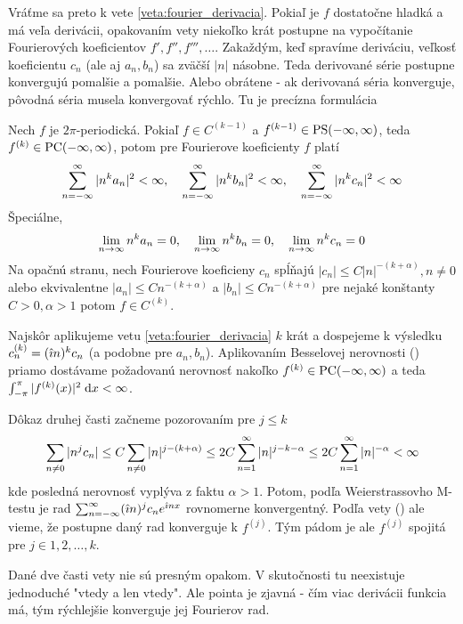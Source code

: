 Vráťme sa preto k vete \ref{veta:fourier_derivacia}. Pokiaľ
je $f$ dostatočne hladká a má veľa derivácii, opakovaním vety
niekoľko krát postupne na vypočítanie Fourierových koeficientov
$f',f'',f''',\dots$. Zakaždým, keď spravíme deriváciu, veľkosť
koeficientu $c_n$ (ale aj $a_n,b_n$) sa zväčší $|n|$ násobne. Teda
derivované série postupne konvergujú pomalšie a pomalšie. Alebo obrátene - 
ak derivovaná séria konverguje, pôvodná séria musela konvergovať
rýchlo. Tu je precízna formulácia
\begin{veta}
    Nech $f$ je $2\pi$-periodická. Pokiaľ
    $f\in C^(k-1)$ a $f^{(k-1)} \in \mbox{PS}(-\infty,\infty)$, teda $f^{(k)} \in
    \mbox{PC}(-\infty,\infty)$, potom pre Fourierove koeficienty $f$ platí
    \begin{equation}
        \sum_{n=-\infty}^{\infty} |n^k a_n|^2 < \infty, \quad
        \sum_{n=-\infty}^{\infty} |n^k b_n|^2 < \infty, \quad
        \sum_{n=-\infty}^{\infty} |n^k c_n|^2 < \infty
    \end{equation}
    Špeciálne,
    \begin{equation}
        \lim_{n \rightarrow \infty} n^k a_n =0, \quad
        \lim_{n \rightarrow \infty} n^k b_n =0, \quad
        \lim_{n \rightarrow \infty} n^k c_n =0
    \end{equation}
    Na opačnú stranu, nech Fourierove koeficieny $c_n$ spĺňajú
    $|c_n| \le C |n|^{-(k+\alpha)}, n\not=0$ alebo ekvivalentne
    $|a_n| \le C n^{-(k+\alpha)}$ a 
    $|b_n| \le C n^{-(k+\alpha)}$ pre nejaké konštanty 
    $C>0, \alpha>1$ potom $f \in C^{(k)}$.
\end{veta}
\begin{dokaz}
    Najskôr aplikujeme vetu  \ref{veta:fourier_derivacia}
    $k$ krát a dospejeme k výsledku
    $c_n^{(k)} = (\hat{\imath} n)^k c_n$ (a podobne pre $a_n,b_n$).
    Aplikovaním Besselovej nerovnosti () priamo
    dostávame požadovanú nerovnosť nakoľko $f^{(k)} \in
    \mbox{PC}(-\infty,\infty)$ a teda $\int_{-\pi}^{\pi} |f^{(k)}(x)|^2 \; \mathrm{d} x < \infty$.

    Dôkaz druhej časti začneme pozorovaním pre $j\le k$
    \begin{equation}
        \sum_{n\not=0} |n^j c_n| \le 
        C \sum_{n\not=0} |n|^{j - (k+\alpha)} \le
        2C \sum_{n=1}^{\infty} |n|^{j-k-\alpha} \le
        2C \sum_{n=1}^{\infty} |n|^{-\alpha} < \infty
    \end{equation}
    kde posledná nerovnosť vyplýva z faktu $\alpha>1$.
    Potom, podľa Weierstrassovho M-testu je rad
    $\sum_{n=-\infty}^{\infty} (\hat{\imath} n)^j c_n e^{\hat{\imath} n x}$ rovnomerne
    konvergentný. Podľa vety () ale vieme, že
    postupne daný rad konverguje k $f^{(j)}$. Tým pádom je ale 
    $f^{(j)}$ spojitá pre $j\in 1,2,\dots,k$.
\end{dokaz}

Dané dve časti vety nie sú presným opakom. V skutočnosti tu neexistuje
jednoduché "vtedy a len vtedy". Ale pointa je zjavná - čím viac
derivácii funkcia má, tým rýchlejšie konverguje jej Fourierov rad.

